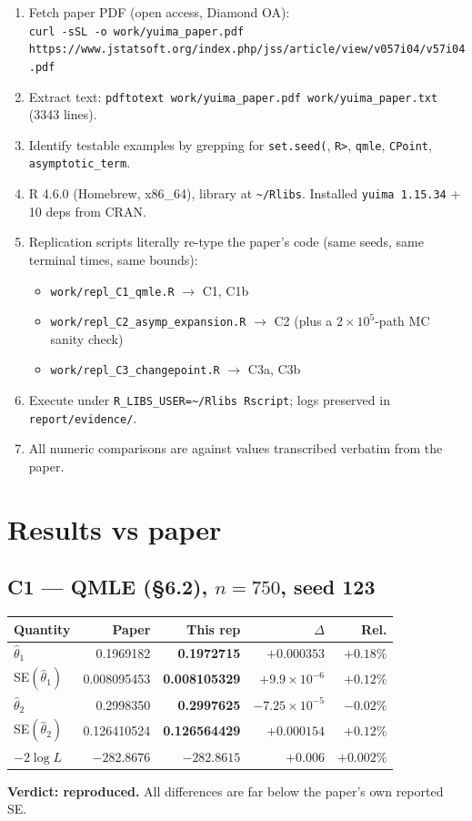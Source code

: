 \documentclass[11pt]{article}
\begin{document}
\begin{enumerate}
\item Fetch paper PDF (open access, Diamond OA): \\
      \texttt{curl -sSL -o work/yuima\_paper.pdf https://www.jstatsoft.org/index.php/jss/article/view/v057i04/v57i04.pdf}
\item Extract text: \texttt{pdftotext work/yuima\_paper.pdf work/yuima\_paper.txt} (3343 lines).
\item Identify testable examples by grepping for \texttt{set.seed(}, \texttt{R>}, \texttt{qmle}, \texttt{CPoint}, \texttt{asymptotic\_term}.
\item R 4.6.0 (Homebrew, x86\_64), library at \texttt{\textasciitilde/Rlibs}. Installed \texttt{yuima 1.15.34} + 10 deps from CRAN.
\item Replication scripts literally re-type the paper's code (same seeds, same terminal times, same bounds):
  \begin{itemize}
    \item \texttt{work/repl\_C1\_qmle.R} $\to$ C1, C1b
    \item \texttt{work/repl\_C2\_asymp\_expansion.R} $\to$ C2 (plus a $2\!\times\!10^5$-path MC sanity check)
    \item \texttt{work/repl\_C3\_changepoint.R} $\to$ C3a, C3b
  \end{itemize}
\item Execute under \texttt{R\_LIBS\_USER=\textasciitilde/Rlibs Rscript}; logs preserved in \texttt{report/evidence/}.
\item All numeric comparisons are against values transcribed verbatim from the paper.
\end{enumerate}

\section{Results vs paper}

\subsection*{C1 --- QMLE (\S6.2), $n=750$, seed 123}
\begin{center}
\begin{tabular}{lrrrr}
\toprule
Quantity & Paper & This rep & $\Delta$ & Rel. \\
\midrule
$\hat\theta_1$      & 0.1969182   & \textbf{0.1972715}   & $+0.000353$   & $+0.18\%$ \\
SE$(\hat\theta_1)$  & 0.008095453 & \textbf{0.008105329} & $+9.9\!\times\!10^{-6}$ & $+0.12\%$ \\
$\hat\theta_2$      & 0.2998350   & \textbf{0.2997625}   & $-7.25\!\times\!10^{-5}$ & $-0.02\%$ \\
SE$(\hat\theta_2)$  & 0.126410524 & \textbf{0.126564429} & $+0.000154$   & $+0.12\%$ \\
$-2\log L$          & $-282.8676$ & \textbf{$-282.8615$} & $+0.006$      & $+0.002\%$ \\
\bottomrule
\end{tabular}
\end{center}
\textbf{Verdict: reproduced.} All differences are far below the paper's own reported SE.
\end{document}
